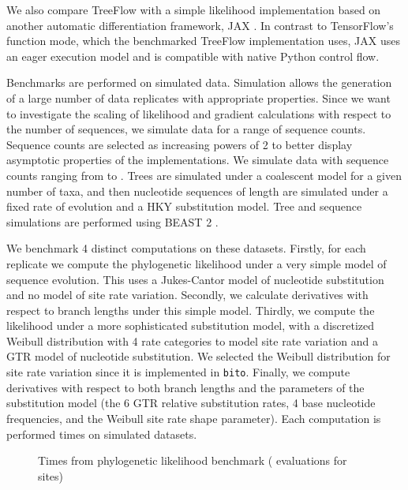 We also compare TreeFlow with a simple likelihood implementation \cite{phylojax} based on another automatic differentiation framework, JAX \cite{jax2018github}. In contrast to TensorFlow's function mode, which the benchmarked TreeFlow implementation uses, JAX uses an eager execution model and is compatible with native Python control flow.

Benchmarks are performed on simulated data. Simulation allows the generation of a large number of data replicates with appropriate properties. Since we want to investigate the scaling of likelihood and gradient calculations with respect to the number of sequences, we simulate data for a range of sequence counts. Sequence counts are selected as increasing powers of 2 to better display asymptotic properties of the implementations. We simulate data with sequence counts ranging from  to . Trees are simulated under a coalescent model for a given number of taxa, and then nucleotide sequences of length  are simulated under a fixed rate of evolution and a HKY substitution model. Tree and sequence simulations are performed using BEAST 2 \cite{bouckaert2019beast}.

We benchmark 4 distinct computations on these datasets. Firstly, for each replicate we compute the phylogenetic likelihood under a very simple model of sequence evolution. This uses a Jukes-Cantor model of nucleotide substitution and no model of site rate variation. Secondly, we calculate derivatives with respect to branch lengths under this simple model. Thirdly, we compute the likelihood under a more sophisticated substitution model, with a discretized Weibull distribution with 4 rate categories to model site rate variation and a GTR model of nucleotide substitution. We selected the Weibull distribution for site rate variation since it is implemented in \texttt{bito}. Finally, we compute derivatives with respect to both branch lengths and the parameters of the substitution model (the 6 GTR relative substitution rates, 4 base nucleotide frequencies, and the Weibull site rate shape parameter). Each computation is performed  times on  simulated datasets.


\begin{figure}
    \centering
    \caption{Times from phylogenetic likelihood benchmark ( evaluations for  sites)}
    \label{fig:benchmark}
\end{figure}


